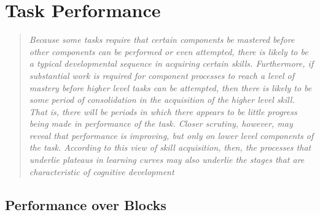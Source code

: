 \documentclass[../main.tex]{subfiles}
\begin{document}
\chapter{Task Performance}\label{chap:performance}

\begin{quote}
    \emph{Because some tasks require that certain components be mastered before other components can be performed or even attempted, there is likely to be a typical developmental sequence in acquiring certain skills. Furthermore, if substantial work is required for component processes to reach a level of mastery before higher level tasks can be attempted, then there is likely to be some period of consolidation in the acquisition of the higher level skill. That is, there will be periods in which there appears to be little progress being made in performance of the task. Closer scrutiny, however, may reveal that performance is improving, but only on lower level components of the task. According to this view of skill acquisition, then, the processes that underlie plateaus in learning curves may also underlie the stages that are characteristic of cognitive development}\\
\end{quote}




\cleardoublepage%


\section{Performance over Blocks}\label{sec:performance_over_blocks}
\end{document}
